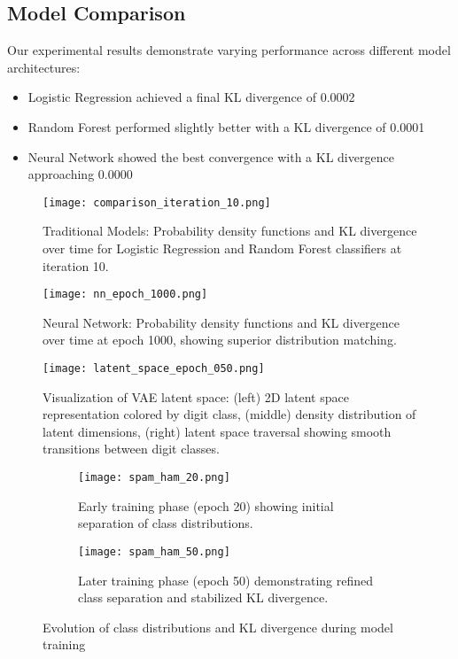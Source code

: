 \documentclass[preprint,12pt]{elsarticle}
\begin{document}
\subsection{Model Comparison}
Our experimental results demonstrate varying performance across different model architectures:

\begin{itemize}
    \item Logistic Regression achieved a final KL divergence of 0.0002
    \item Random Forest performed slightly better with a KL divergence of 0.0001
    \item Neural Network showed the best convergence with a KL divergence approaching 0.0000
\end{itemize}

\begin{figure}[htbp]
    \centering
    \texttt{[image: comparison\_iteration\_10.png]}
    \caption{Traditional Models: Probability density functions and KL divergence over time for Logistic Regression and Random Forest classifiers at iteration 10.}
    \label{fig:traditional_models}
\end{figure}

\begin{figure}[htbp]
    \centering
    \texttt{[image: nn\_epoch\_1000.png]}
    \caption{Neural Network: Probability density functions and KL divergence over time at epoch 1000, showing superior distribution matching.}
    \label{fig:neural_network}
\end{figure}

\begin{figure}[htbp]
    \centering
    \texttt{[image: latent\_space\_epoch\_050.png]}
    \caption{Visualization of VAE latent space: (left) 2D latent space representation colored by digit class, (middle) density distribution of latent dimensions, (right) latent space traversal showing smooth transitions between digit classes.}
    \label{fig:vae_latent}
\end{figure}

\begin{figure}[htbp]
    \centering
    \begin{subfigure}[b]{0.48\textwidth}
        \texttt{[image: spam\_ham\_20.png]}
        \caption{Early training phase (epoch 20) showing initial separation of class distributions.}
        \label{fig:early_training}
    \end{subfigure}
    \hfill
    \begin{subfigure}[b]{0.48\textwidth}
        \texttt{[image: spam\_ham\_50.png]}
        \caption{Later training phase (epoch 50) demonstrating refined class separation and stabilized KL divergence.}
        \label{fig:late_training}
    \end{subfigure}
    \caption{Evolution of class distributions and KL divergence during model training}
    \label{fig:training_evolution}
\end{figure}
\end{document}
